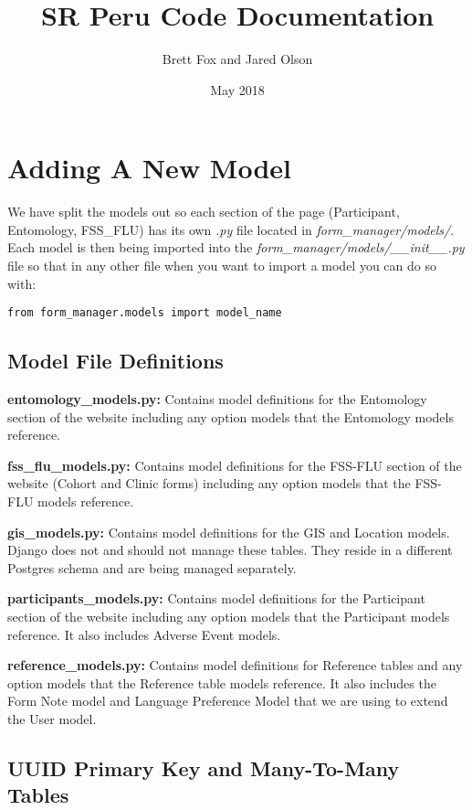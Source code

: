 \documentclass{article}
\title{ SR Peru Code Documentation}
\author{ Brett Fox and Jared Olson }
\date{ May 2018 }
\begin{document}
\maketitle

\newpage
\tableofcontents
\newpage

\section{Adding A New Model}
We have split the models out so each section of the page (Participant, Entomology, FSS\_FLU) has its own \textit{.py} file located in \textit{form\_manager/models/}.  Each model is then being imported into the \textit{form\_manager/models/\_\_init\_\_.py} file so that in any other file when you want to import a model you can do so with:
\begin{verbatim}
from form_manager.models import model_name
\end{verbatim}
\subsection{Model File Definitions}
\textbf{entomology\_models.py:} Contains model definitions for the Entomology section of the website including any option models that the Entomology models reference.

\textbf{fss\_flu\_models.py:} Contains model definitions for the FSS-FLU section of the website (Cohort and Clinic forms) including any option models that the FSS-FLU models reference.

\textbf{gis\_models.py:} Contains model definitions for the GIS and Location models.  Django does not and should not manage these tables.  They reside in a different Postgres schema and are being managed separately.

\textbf{participants\_models.py:} Contains model definitions for the Participant section of the website including any option models that the Participant models reference. It also includes Adverse Event models.

\textbf{reference\_models.py:} Contains model definitions for Reference tables and any option models that the Reference table models reference.  It also includes the Form Note model and Language Preference Model that we are using to extend the User model.

\subsection{UUID Primary Key and Many-To-Many Tables}
\end{document}
